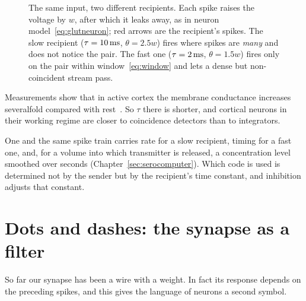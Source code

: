 \begin{figure}[t]
\caption{The same input, two different recipients. Each spike raises the voltage by $w$, after which it leaks away, as in neuron model~\eqref{eq:glutneuron}; red arrows are the recipient's spikes. The slow recipient ($\tau=10\,\text{ms}$, $\theta=2.5w$) fires where spikes are \emph{many} and does not notice the pair. The fast one ($\tau=2\,\text{ms}$, $\theta=1.5w$) fires only on the pair within window~\eqref{eq:window} and lets a dense but non-coincident stream pass.}
\label{fig:reader}
\end{figure}

Measurements show that in active cortex the membrane conductance increases severalfold compared with rest~\cite{Destexhe2003}. So $\tau$ there is shorter, and cortical neurons in their working regime are closer to coincidence detectors than to integrators.

\begin{keyblock}
\begin{proposition}
\label{prop:reader}
One and the same spike train carries rate for a slow recipient, timing for a fast one, and, for a volume into which transmitter is released, a concentration level smoothed over seconds (Chapter~\ref{sec:serocomputer}). Which code is used is determined not by the sender but by the recipient's time constant, and inhibition adjusts that constant.
\end{proposition}
\end{keyblock}
\section{Dots and dashes: the synapse as a filter}

So far our synapse has been a wire with a weight. In fact its response depends on the preceding spikes, and this gives the language of neurons a second symbol.


